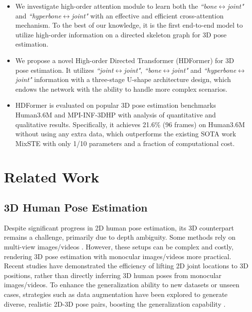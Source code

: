 \documentclass{article}
\begin{document}
\begin{itemize}[leftmargin=*]
\item We investigate high-order attention module to learn both the \textit{``bone$\leftrightarrow$joint"} and \textit{``hyperbone$\leftrightarrow$joint"} with an effective and efficient cross-attention mechanism. To the best of our knowledge, it is the first end-to-end model to utilize high-order information on a directed skeleton graph for 3D pose estimation.

\item We propose a novel High-order Directed Transformer (HDFormer) for 3D pose estimation. It utilizes \textit{``joint$\leftrightarrow$joint"}, \textit{``bone$\leftrightarrow$joint"} and \textit{``hyperbone$\leftrightarrow$joint"} information with a three-stage U-shape architecture design, which endows the network with the ability to handle more complex scenarios.

\item HDFormer is evaluated on popular 3D pose estimation benchmarks Human3.6M and MPI-INF-3DHP with analysis of quantitative and qualitative results. Specifically, it achieves 21.6\% (96 frames) on Human3.6M without using any extra data, which outperforms the existing SOTA work MixSTE \cite{ZhangCVPR22MixSTE} with only 1/10 parameters and a fraction of computational cost.
\end{itemize}


\section{Related Work}
\subsection{3D Human Pose Estimation}
Despite significant progress in 2D human pose estimation, its 3D counterpart remains a challenge, primarily due to depth ambiguity. Some methods rely on multi-view images/videos \cite{Iskakov_2019_ICCV,Qiu_2019_ICCV,ye2022-faster,he2021db,zhao2018multi,huang2021generating}. However, these setups can be complex and costly, rendering 3D pose estimation with monocular images/videos more practical. Recent studies \cite{pavllo2019-3d,zhu2021-posegtac} have demonstrated the efficiency of lifting 2D joint locations to 3D positions, rather than directly inferring 3D human poses from monocular images/videos. 
To enhance the generalization ability to new datasets or unseen cases, strategies such as data augmentation have been explored to generate diverse, realistic 2D-3D pose pairs, boosting the generalization capability \cite{2021PoseAug,li2020-cascaded}.
\end{document}
